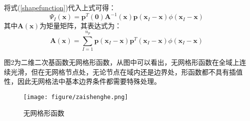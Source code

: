 \documentclass[a4paper]{article}
\begin{document}
将式(\ref{shapefunction})代入上式可得：
\begin{equation}
    \Psi_I(\pmb{x})=\pmb{p}^T(\pmb 0)\pmb{A}^{-1}(\pmb{x})\pmb{p}(\pmb{x}_I-\pmb{x})\phi(\pmb{x}_I-\pmb{x})
\end{equation}
其中$\pmb{A}(\pmb{x})$为矩量矩阵，其表达式为：
\begin{equation}
    \pmb{A}(\pmb{x})=\sum_{I=1}^{n_p}\pmb{p}(\pmb{x}_I-\pmb{x})\pmb{p}^T(\pmb{x}_I-\pmb{x})\phi(\pmb{x}_I-\pmb{x})
\end{equation}\par
图2为二维二次基函数无网格形函数，从图中可以看出，无网格形函数在全域上连续光滑，但在无网格节点处，无论节点在域内还是边界处，形函数都不具有插值性，因此无网格法中基本边界条件都需要特殊处理。
\begin{figure}[!h]
    \centering
    \texttt{[image: figure/zaishenghe.png]}
    \caption{无网格形函数}
\end{figure}\newpage
\end{document}

